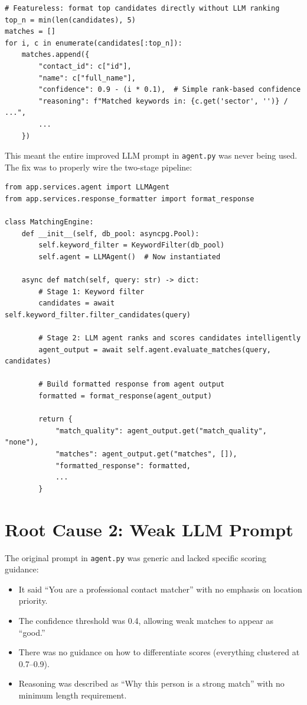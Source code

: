 \documentclass[12pt, a4paper]{report}
\begin{document}
\begin{lstlisting}[style=pythonstyle, caption={Original matching\_engine.py --- LLM bypassed}]
# Featureless: format top candidates directly without LLM ranking
top_n = min(len(candidates), 5)
matches = []
for i, c in enumerate(candidates[:top_n]):
    matches.append({
        "contact_id": c["id"],
        "name": c["full_name"],
        "confidence": 0.9 - (i * 0.1),  # Simple rank-based confidence
        "reasoning": f"Matched keywords in: {c.get('sector', '')} / ...",
        ...
    })
\end{lstlisting}

This meant the entire improved LLM prompt in \texttt{agent.py} was never being used. The fix was to properly wire the two-stage pipeline:

\begin{lstlisting}[style=pythonstyle, caption={Fixed matching\_engine.py --- LLM properly called}]
from app.services.agent import LLMAgent
from app.services.response_formatter import format_response

class MatchingEngine:
    def __init__(self, db_pool: asyncpg.Pool):
        self.keyword_filter = KeywordFilter(db_pool)
        self.agent = LLMAgent()  # Now instantiated

    async def match(self, query: str) -> dict:
        # Stage 1: Keyword filter
        candidates = await self.keyword_filter.filter_candidates(query)

        # Stage 2: LLM agent ranks and scores candidates intelligently
        agent_output = await self.agent.evaluate_matches(query, candidates)

        # Build formatted response from agent output
        formatted = format_response(agent_output)

        return {
            "match_quality": agent_output.get("match_quality", "none"),
            "matches": agent_output.get("matches", []),
            "formatted_response": formatted,
            ...
        }
\end{lstlisting}

\section{Root Cause 2: Weak LLM Prompt}

The original prompt in \texttt{agent.py} was generic and lacked specific scoring guidance:

\begin{itemize}[itemsep=3pt]
    \item It said ``You are a professional contact matcher'' with no emphasis on location priority.
    \item The confidence threshold was 0.4, allowing weak matches to appear as ``good.''
    \item There was no guidance on how to differentiate scores (everything clustered at 0.7--0.9).
    \item Reasoning was described as ``Why this person is a strong match'' with no minimum length requirement.
\end{itemize}
\end{document}
